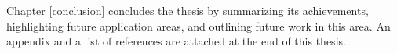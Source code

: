 Chapter \ref{conclusion} concludes the thesis by summarizing its achievements, highlighting future application areas, and outlining future work in this area. 
An appendix and a list of references are attached at the end of this thesis.








